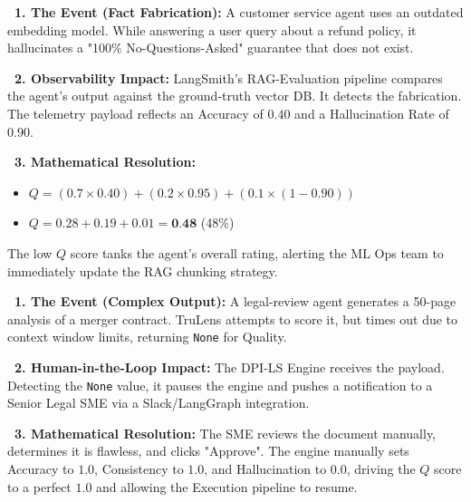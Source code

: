 \documentclass[11pt,a4paper]{article}
\begin{document}
\begin{tcolorbox}[enhanced, colback=dpired!5!white, colframe=dpired, title={\textbf{\faRobot\ Scenario 1: The Hallucination Spike}}, fonttitle=\bfseries, boxrule=1pt, arc=2mm, drop shadow]
\textbf{\color{dpired}\faExclamationCircle\ 1. The Event (Fact Fabrication):} 
A customer service agent uses an outdated embedding model. While answering a user query about a refund policy, it hallucinates a "100\% No-Questions-Asked" guarantee that does not exist.

\vspace{0.2cm}
\textbf{\color{dpiblue}\faSearch\ 2. Observability Impact:} 
LangSmith's RAG-Evaluation pipeline compares the agent's output against the ground-truth vector DB. It detects the fabrication. The telemetry payload reflects an Accuracy of $0.40$ and a Hallucination Rate of $0.90$.

\vspace{0.2cm}
\textbf{\color{dpigreen}\faCalculator\ 3. Mathematical Resolution:}
\begin{itemize}
    \item $Q = (0.7 \times 0.40) + (0.2 \times 0.95) + (0.1 \times (1 - 0.90))$
    \item $Q = 0.28 + 0.19 + 0.01 = \textbf{0.48}$ (48\%)
\end{itemize}
The low $Q$ score tanks the agent's overall rating, alerting the ML Ops team to immediately update the RAG chunking strategy.
\end{tcolorbox}

\vspace{0.5cm}

\begin{tcolorbox}[enhanced, colback=dpigreen!5!white, colframe=dpigreen, title={\textbf{\faUserTie\ Scenario 2: The SME Override}}, fonttitle=\bfseries, boxrule=1pt, arc=2mm, drop shadow]
\textbf{\color{dpigreen}\faChartLine\ 1. The Event (Complex Output):} 
A legal-review agent generates a 50-page analysis of a merger contract. TruLens attempts to score it, but times out due to context window limits, returning \texttt{None} for Quality.

\vspace{0.2cm}
\textbf{\color{dpiblue}\faUsers\ 2. Human-in-the-Loop Impact:} 
The DPI-LS Engine receives the payload. Detecting the \texttt{None} value, it pauses the engine and pushes a notification to a Senior Legal SME via a Slack/LangGraph integration.

\vspace{0.2cm}
\textbf{\color{dpiteal}\faTrophy\ 3. Mathematical Resolution:}
The SME reviews the document manually, determines it is flawless, and clicks "Approve". The engine manually sets Accuracy to $1.0$, Consistency to $1.0$, and Hallucination to $0.0$, driving the $Q$ score to a perfect $1.0$ and allowing the Execution pipeline to resume.
\end{tcolorbox}
\end{document}
